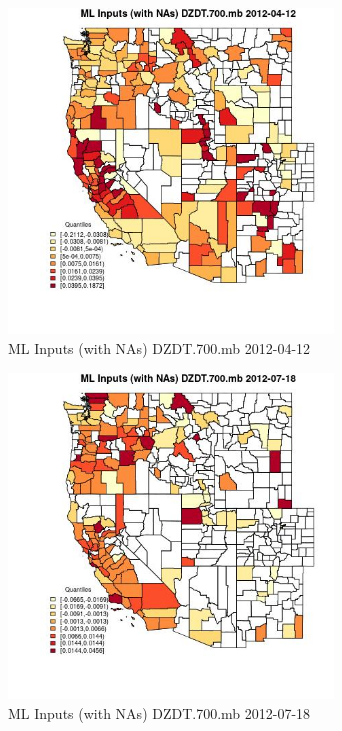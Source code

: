 \begin{figure} 
\centering  
\includegraphics[width=0.77\textwidth]{Code_Outputs/Report_ML_input_PM25_Step4_part_e_de_duplicated_aves_compiled_2019-05-14wNAs_CountyDZDT700mbMean2012-04-12_2012-04-12.jpg} 
\caption{\label{fig:Report_ML_input_PM25_Step4_part_e_de_duplicated_aves_compiled_2019-05-14wNAsCountyDZDT700mbMean2012-04-12_2012-04-12}ML Inputs (with NAs) DZDT.700.mb 2012-04-12} 
\end{figure} 
 

\begin{figure} 
\centering  
\includegraphics[width=0.77\textwidth]{Code_Outputs/Report_ML_input_PM25_Step4_part_e_de_duplicated_aves_compiled_2019-05-14wNAs_CountyDZDT700mbMean2012-07-18_2012-07-18.jpg} 
\caption{\label{fig:Report_ML_input_PM25_Step4_part_e_de_duplicated_aves_compiled_2019-05-14wNAsCountyDZDT700mbMean2012-07-18_2012-07-18}ML Inputs (with NAs) DZDT.700.mb 2012-07-18} 
\end{figure} 
 

